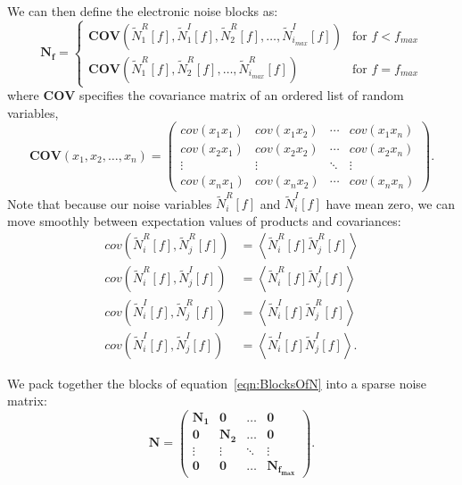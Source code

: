 We can then define the electronic noise blocks as:
\begin{equation} \label{eqn:BlocksOfN}
\mathbf{N_f} = \begin{cases}
  \mathbf{COV}\left(\widetilde{N}_1^R[f], \widetilde{N}_1^I[f], \widetilde{N}_2^R[f], \dots, \widetilde{N}_{i_{max}}^I[f]\right) & \text{for $f < f_{max}$} \\
\mathbf{COV}\left(\widetilde{N}_1^R[f], \widetilde{N}_2^R[f], \dots, \widetilde{N}_{i_{max}}^R[f]\right) & \text{for $f = f_{max}$}
\end{cases}
\end{equation}
where $\mathbf{COV}$ specifies the covariance matrix of an ordered list of random variables,
\begin{equation}
\mathbf{COV}\left( x_1, x_2, \dots, x_n \right) = \begin{pmatrix}
  cov(x_1 x_1) & cov(x_1 x_2) & \cdots & cov(x_1 x_n) \\
  cov(x_2 x_1) & cov(x_2 x_2) & \cdots & cov(x_2 x_n) \\
  \vdots & \vdots & \ddots & \vdots \\
  cov(x_n x_1) & cov(x_n x_2) & \cdots & cov(x_n x_n)
\end{pmatrix}. \end{equation}
Note that because our noise variables $\widetilde{N}_i^R[f]$ and $\widetilde{N}_i^I[f]$ have mean zero, we can move smoothly between expectation values of products and covariances:
\begin{equation} \begin{aligned}
cov(\widetilde{N}_i^R[f], \widetilde{N}_j^R[f]) &= \left< \widetilde{N}_i^R[f] \widetilde{N}_j^R[f] \right>\\
cov(\widetilde{N}_i^R[f], \widetilde{N}_j^I[f]) &= \left< \widetilde{N}_i^R[f] \widetilde{N}_j^I[f] \right>\\
cov(\widetilde{N}_i^I[f], \widetilde{N}_j^R[f]) &= \left< \widetilde{N}_i^I[f] \widetilde{N}_j^R[f] \right>\\
cov(\widetilde{N}_i^I[f], \widetilde{N}_j^I[f]) &= \left< \widetilde{N}_i^I[f] \widetilde{N}_j^I[f] \right>.
\end{aligned} \end{equation}

We pack together the blocks of equation~\ref{eqn:BlocksOfN} into a sparse noise matrix:
\begin{equation} \label{eqn:DefinitionOfN}
\mathbf{N} = \begin{pmatrix}
  \mathbf{N_1} & \mathbf{0} & \dots & \mathbf{0} \\
  \mathbf{0} & \mathbf{N_2} & \dots & \mathbf{0} \\
  \vdots & \vdots & \ddots & \vdots \\
  \mathbf{0} & \mathbf{0} & \dots & \mathbf{N_{f_{max}}}
\end{pmatrix} .\end{equation}

